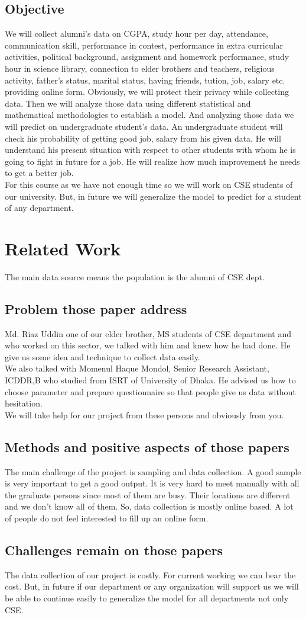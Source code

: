 \documentclass{article}
\begin{document}
\subsection{Objective}
We will collect alumni's data on CGPA, study hour per day, attendance, communication skill, performance in contest, performance in extra curricular activities, political background, assignment and homework performance, study hour in science library, connection to elder brothers and teachers, religious activity, father's status, marital status, having friends, tution, job, salary   etc. providing online form. Obviously, we will protect their privacy while collecting data. Then we will analyze those data using different statistical and mathematical methodologies to establish a model. And analyzing those data we will predict on undergraduate student's data. An undergraduate student will check his probability of getting good job, salary from  his given data. He will understand his present situation with respect to other students with whom he is going to fight in future for a job. He will realize how much improvement  he needs to get a better job.\\
For this course as we have not enough time so we will work on CSE students of our university. But, in future we will generalize the model to predict for a student of any department.


\section{Related Work}
The main data source means the population is the alumni of CSE dept.


\subsection{Problem those paper address}
Md. Riaz Uddin one of our elder brother, MS students of CSE department and who worked on this sector, we talked with him and knew how he had done. He give us some idea and technique to collect data easily.\\We also talked with Momenul Haque Mondol, Senior Research Assistant, ICDDR,B who studied from ISRT of University of Dhaka. He advised us how to choose parameter and prepare questionnaire so that people give us data without hesitation.\\
We will take help for our project from these persons and obviously from you.

\subsection{Methods and positive aspects of those papers}
The main challenge of the project is sampling and data collection. A good sample is very important to get a good output. It is very hard to meet manually with all the graduate persons since most of them are busy. Their locations are different and we don't know all of them. So, data collection is mostly online based. A lot of people do not feel interested to fill up an online form.


\subsection{Challenges remain on those papers}
The data collection of our project is costly. For current working we can bear the cost. But, in future if our department or any organization will support us we will be able to continue easily to generalize the model for all departments not only CSE.
\end{document}
